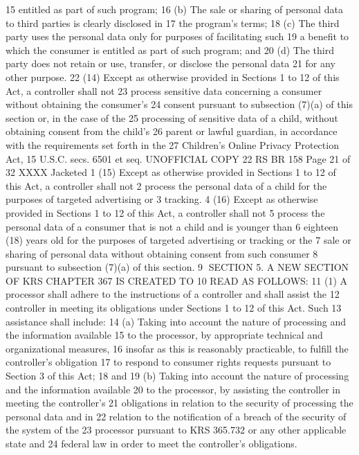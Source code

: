 15 entitled as part of such program;
16 (b) The sale or sharing of personal data to third parties is clearly disclosed in
17 the program's terms;
18 (c) The third party uses the personal data only for purposes of facilitating such
19 a benefit to which the consumer is entitled as part of such program; and
20 (d) The third party does not retain or use, transfer, or disclose the personal data
21 for any other purpose.
22 (14) Except as otherwise provided in Sections 1 to 12 of this Act, a controller shall not
23 process sensitive data concerning a consumer without obtaining the consumer's
24 consent pursuant to subsection (7)(a) of this section or, in the case of the
25 processing of sensitive data of a child, without obtaining consent from the child's
26 parent or lawful guardian, in accordance with the requirements set forth in the
27 Children's Online Privacy Protection Act, 15 U.S.C. secs. 6501 et seq.
UNOFFICIAL COPY 22 RS BR 158
Page 21 of 32
XXXX Jacketed
1 (15) Except as otherwise provided in Sections 1 to 12 of this Act, a controller shall not
2 process the personal data of a child for the purposes of targeted advertising or
3 tracking.
4 (16) Except as otherwise provided in Sections 1 to 12 of this Act, a controller shall not
5 process the personal data of a consumer that is not a child and is younger than
6 eighteen (18) years old for the purposes of targeted advertising or tracking or the
7 sale or sharing of personal data without obtaining consent from such consumer
8 pursuant to subsection (7)(a) of this section.
9 SECTION 5. A NEW SECTION OF KRS CHAPTER 367 IS CREATED TO
10 READ AS FOLLOWS:
11 (1) A processor shall adhere to the instructions of a controller and shall assist the
12 controller in meeting its obligations under Sections 1 to 12 of this Act. Such
13 assistance shall include:
14 (a) Taking into account the nature of processing and the information available
15 to the processor, by appropriate technical and organizational measures,
16 insofar as this is reasonably practicable, to fulfill the controller's obligation
17 to respond to consumer rights requests pursuant to Section 3 of this Act;
18 and
19 (b) Taking into account the nature of processing and the information available
20 to the processor, by assisting the controller in meeting the controller's
21 obligations in relation to the security of processing the personal data and in
22 relation to the notification of a breach of the security of the system of the
23 processor pursuant to KRS 365.732 or any other applicable state and
24 federal law in order to meet the controller's obligations.
